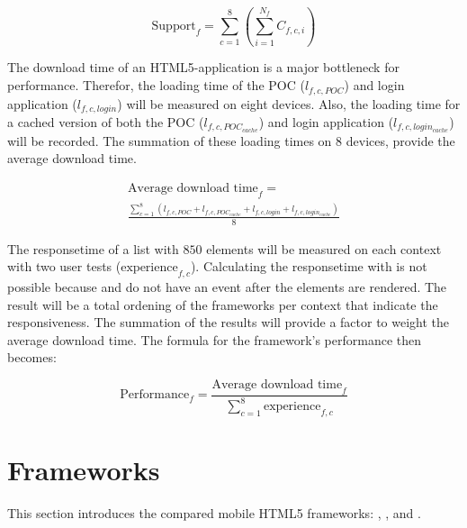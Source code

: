 \documentclass[a4paper]{artikel3}
\newcommand{\setspace}[0]{\vspace{2mm}}
\renewcommand{\paragraph}[1]{\setspace \noindent {\bf #1}  }
\begin{document}
\begin{equation}
  \text{Support}_f = \sum_{c=1}^{8}{\left(\sum_{i=1}^{N_f}C_{f,c,i}\right)}
  \label{eq:ondersteuning}
\end{equation}

\paragraph{Performance}
The download time of an HTML5-application is a major bottleneck for performance.
Therefor,  the loading time of the POC ($l_{f,c,POC}$) and login application ($l_{f,c,login}$) will be measured on eight devices.
Also,  the loading time for a cached version of both the POC ($l_{f,c,POC_{cache}}$) and login application ($l_{f,c,login_{cache}}$) will be recorded.
The summation of these loading times on $8$ devices, provide the average download time.

\begin{equation}
\begin{split}
\text{Average download time}_f =  \\ \frac{\sum_{c=1}^{8}\left(l_{f,c,POC}+l_{f,c,POC_{cache}}+ l_{f,c,login} + l_{f,c,login_{cache}}\right)}{8}
  \label{eq:dowloadtime}
\end{split}
\end{equation}

The responsetime of a list with $850$ elements will be measured on each context with two user tests ($\text{experience}_{f,c}$).
Calculating the responsetime with \js{} is not possible because \sta{} and \lungo{} do not have an event after the elements are rendered.
The result will be a total ordening of the frameworks per context that indicate the responsiveness.
The summation of the results will provide a factor to weight the average download time.
The formula for the framework's performance then becomes:

\begin{equation}
  \text{Performance}_f =  \frac{\text{Average download time}_f}{\sum_{c=1}^{8}{\text{experience}_{f,c}}}
  \label{eq:performance}
\end{equation}


\section{Frameworks} %
\label{sec:frameworks}
This section introduces the compared mobile HTML5 frameworks: \st{}, \kendo{}, \jqm{} and \lungo{}.
\end{document}
